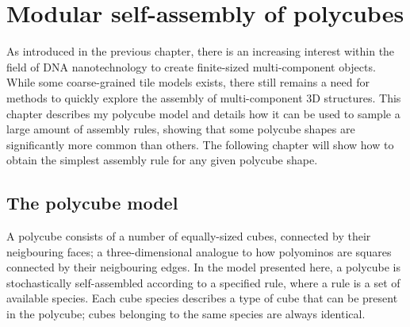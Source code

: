 \chapter{\label{ch:3-polycubes}Modular self-assembly of polycubes}

\minitoc

As introduced in the previous chapter, there is an increasing interest within the field of DNA nanotechnology to create finite-sized multi-component objects. While some coarse-grained tile models exists, there still remains a need for methods to quickly explore the assembly of multi-component 3D structures.
This chapter describes my polycube model and details how it can be used to sample a large amount of assembly rules, showing that some polycube shapes are significantly more common than others. The following chapter will show how to obtain the simplest assembly rule for any given polycube shape.

\section{The polycube model}
A polycube consists of a number of equally-sized cubes, connected by their neigbouring faces; a three-dimensional analogue to how polyominos are squares connected by their neigbouring edges. In the model presented here, a polycube is stochastically self-assembled according to a specified rule, where a rule is a set of available species. Each cube species describes a type of cube that can be present in the polycube; cubes belonging to the same species are always identical.

